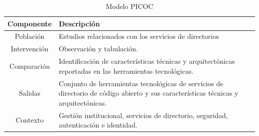 \begin{table}[H]
	\centering
	\caption{Modelo \acs{PICOC}}
	\label{tab:modelo-picoc}

	\renewcommand{\arraystretch}{1.2}
	\fontsize{9pt}{10pt}\selectfont

	\begin{tabularx}{\textwidth}{|c|X|}
		\hline
		\textbf{Componente} &
		\textbf{Descripción}
		\\
		\hline
		Población           &
		Estudios relacionados con los servicios de directorios
		\\
		\hline
		Intervención        &
		Observación y tabulación.
		\\
		\hline
		Comparación         &
		Identificación de características técnicas y arquitectónicas reportadas en las herramientas tecnológicas.
		\\
		\hline
		Salidas             &
		Conjunto de herramientas tecnológicas de servicios de directorio de código abierto y sus características técnicas y arquitectónicas.
		\\
		\hline
		Contexto            &
		Gestión institucional, servicios de directorio, seguridad, autenticación e identidad.
		\\
		\hline
	\end{tabularx}
\end{table}
